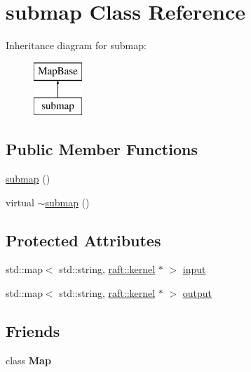 \hypertarget{classsubmap}{}\section{submap Class Reference}
\label{classsubmap}
Inheritance diagram for submap\+:\begin{figure}[H]
\begin{center}
\leavevmode
\includegraphics[height=2.000000cm]{classsubmap}
\end{center}
\end{figure}
\subsection*{Public Member Functions}
\begin{DoxyCompactItemize}
\item 
\hyperlink{classsubmap_aafd8554ab31a0cea63cbffa2f12e7e62}{submap} ()
\item 
virtual \hyperlink{classsubmap_a9a94867e037a16ad8620a23987baa0ef}{$\sim$submap} ()
\end{DoxyCompactItemize}
\subsection*{Protected Attributes}
\begin{DoxyCompactItemize}
\item 
std\+::map$<$ std\+::string, \hyperlink{classraft_1_1kernel}{raft\+::kernel} $\ast$ $>$ \hyperlink{classsubmap_a5623479b44a75778beda5bfc63441edb}{input}
\item 
std\+::map$<$ std\+::string, \hyperlink{classraft_1_1kernel}{raft\+::kernel} $\ast$ $>$ \hyperlink{classsubmap_a668f86fc580ad8d9a6886af0615de96a}{output}
\end{DoxyCompactItemize}
\subsection*{Friends}
\begin{DoxyCompactItemize}
\item 
\hypertarget{classsubmap_ad2f32e921244459f7cc6d50355429cc6}{}class {\bfseries Map}\label{classsubmap_ad2f32e921244459f7cc6d50355429cc6}

\end{DoxyCompactItemize}
